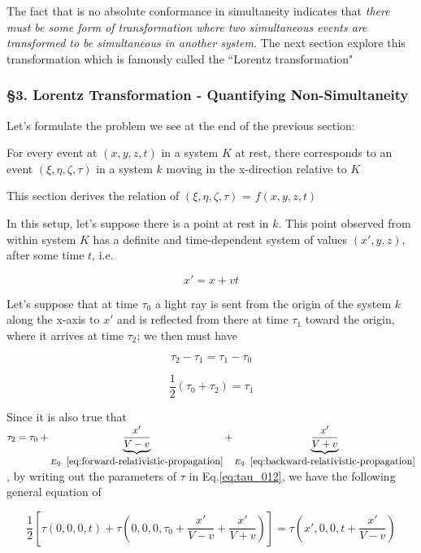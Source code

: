 The fact that is no absolute conformance in simultaneity indicates that \textit{there must be some form of
transformation where two simultaneous events are transformed to be simultaneous in another system}. The next section
explore this transformation which is famously called the ``Lorentz transformation"

\subsubsection{\hfil \S3. Lorentz Transformation - Quantifying Non-Simultaneity \hfil}

Let's formulate the problem we see at the end of the previous section:

For every event at $(x, y, z, t)$ in a system $K$ at rest, there corresponds to an event $(\xi, \eta, \zeta, \tau)$ in
a system $k$ moving in the x-direction relative to $K$

This section derives the relation of $(\xi, \eta, \zeta, \tau)$ = $f(x, y, z, t)$

In this setup, let's suppose there is a point at rest in $k$. This point observed from within system $K$ has a definite
and time-dependent system of values $(x', y, z)$, after some time $t$, i.e.

\[
    x' = x + vt
\]

Let's suppose that at time $\tau_0$ a light ray is sent from the origin of the system $k$ along the x-axis to $x'$ and
is reflected from there at time $\tau_1$ toward the origin, where it arrives at time $\tau_2$; we then must have

\[
    \tau_2 - \tau_1 = \tau_1 - \tau_0
\]

\begin{equation} \label{eq:tau_012}
\frac{1}{2}(\tau_0 + \tau_2) = \tau_1
\end{equation}

Since it is also true that
$\tau_2 = \tau_0 + \underbrace{\frac{x'}{V - v}}_{Eq.~\ref{eq:forward-relativistic-propagation}} + \underbrace{\frac{x'}{V + v}}_{Eq.~\ref{eq:backward-relativistic-propagation}}$,
by writing out the parameters of $\tau$ in Eq.\ref{eq:tau_012}, we have the following general equation of

\begin{equation}
    \frac{1}{2}\left[ \tau(0, 0, 0, t) + \tau\left( 0, 0, 0, \tau_0 + \frac{x'}{V - v} + \frac{x'}{V + v} \right) \right] = \tau\left( x', 0, 0, t + \frac{x'}{V -v} \right)
\end{equation}

